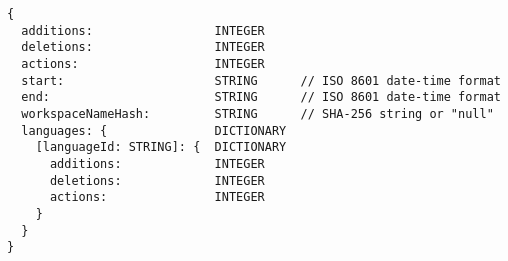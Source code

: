\begin{verbatim}
{
  additions:                 INTEGER
  deletions:                 INTEGER
  actions:                   INTEGER
  start:                     STRING      // ISO 8601 date-time format
  end:                       STRING      // ISO 8601 date-time format
  workspaceNameHash:         STRING      // SHA-256 string or "null"
  languages: {               DICTIONARY
    [languageId: STRING]: {  DICTIONARY
      additions:             INTEGER
      deletions:             INTEGER
      actions:               INTEGER
    }
  }
}
\end{verbatim}
